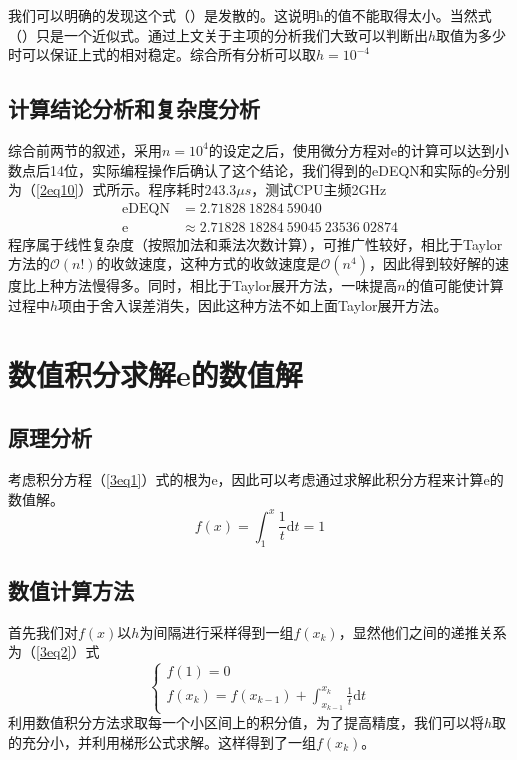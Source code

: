 \documentclass[onecolumn,compsoc]{IEEEtran}
\renewcommand{\d}{\mathrm{d}}
\renewcommand{\|}{\Bigg |}
\newcommand{\e}{\mathrm{e}}
\begin{document}
我们可以明确的发现这个式（\label{A8eq}）是发散的。这说明h的值不能取得太小。当然式（\label{A8eq}）只是一个近似式。通过上文关于主项的分析我们大致可以判断出$h$取值为多少时可以保证上式的相对稳定。综合所有分析可以取$h=10^{-4}$
\subsection{计算结论分析和复杂度分析}
综合前两节的叙述，采用$n =  10^4$的设定之后，使用微分方程对e的计算可以达到小数点后14位，实际编程操作后确认了这个结论，我们得到的eDEQN和实际的e分别为（\ref{2eq10}）式所示。程序耗时$243.3\mu s$，测试CPU主频2GHz
\begin{equation}\label{2eq10}\begin{aligned}
\mathrm{eDEQN} &= 2.71828\ 18284\ 59040 \\ 
\e &\approx 2.71828\ 18284\ 59045\ 23536\ 02874 
\end{aligned}\end{equation}
程序属于线性复杂度（按照加法和乘法次数计算），可推广性较好，相比于Taylor方法的$\mathcal{O}(n!)$的收敛速度，这种方式的收敛速度是$\mathcal{O}(n^4)$，因此得到较好解的速度比上种方法慢得多。同时，相比于Taylor展开方法，一味提高$n$的值可能使计算过程中$h$项由于舍入误差消失，因此这种方法不如上面Taylor展开方法。
\section{数值积分求解e的数值解}
\subsection{原理分析}
考虑积分方程（\ref{3eq1}）式的根为e，因此可以考虑通过求解此积分方程来计算e的数值解。
\begin{equation}\label{3eq1}
f(x) = \int_1^x\frac{1}{t}\d t = 1
\end{equation}
\subsection{数值计算方法}
首先我们对$f(x)$以$h$为间隔进行采样得到一组$f(x_k)$，显然他们之间的递推关系为（\ref{3eq2}）式
\begin{equation}\label{3eq2}\begin{cases}
f(1) = 0\\
f(x_k) = f(x_{k-1}) + \int_{x_{k-1}}^{x_k}\frac{1}{t}\d t
\end{cases}\end{equation}
利用数值积分方法求取每一个小区间上的积分值，为了提高精度，我们可以将$h$取的充分小，并利用梯形公式求解。这样得到了一组$f(x_k)$。
\end{document}
